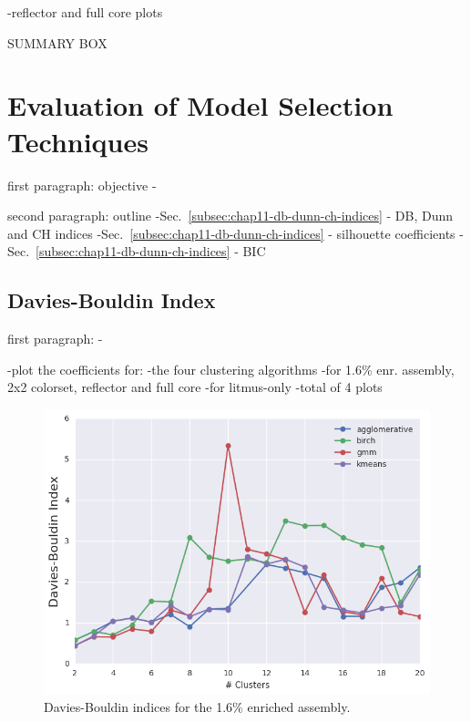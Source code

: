 \clearpage

-reflector and full core plots

SUMMARY BOX


\section{Evaluation of Model Selection Techniques}
\label{sec:chap11-model-select}

first paragraph: objective
-

second paragraph: outline
-Sec.~\ref{subsec:chap11-db-dunn-ch-indices} - DB, Dunn and CH indices
-Sec.~\ref{subsec:chap11-db-dunn-ch-indices} - silhouette coefficients
-Sec.~\ref{subsec:chap11-db-dunn-ch-indices} - BIC


\subsection{Davies-Bouldin Index}
\label{subsec:chap11-db-index}

first paragraph:
-

-plot the coefficients for:
  -the four clustering algorithms
  -for 1.6\% enr. assembly, 2x2 colorset, reflector and full core
  -for litmus-only
  -total of 4 plots

\clearpage

\begin{figure}[h!]
\centering
\includegraphics[width=0.87\linewidth]{figures/results/model-select/assm-16/db-combined-U238-capture-1}
\vspace{2mm}
\caption[Davies-Bouldin indices for the 1.6\% enriched assembly]{Davies-Bouldin indices for the 1.6\% enriched assembly.}
\label{fig:chap11-assm-16-db-index}
\end{figure}

